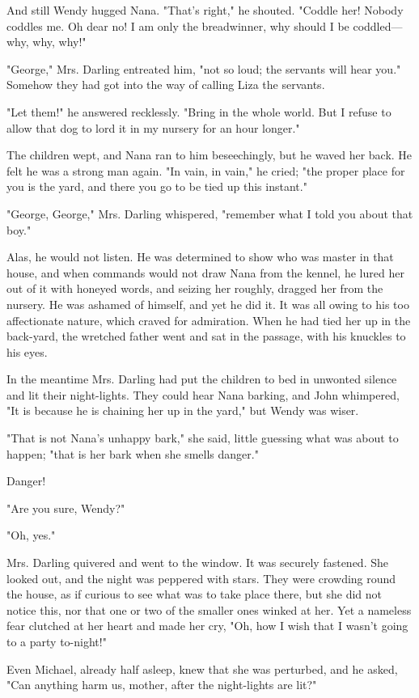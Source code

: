 And still Wendy hugged Nana. "That's right," he shouted. "Coddle her!
Nobody coddles me. Oh dear no! I am only the breadwinner, why should I be
coddled—why, why, why!"


"George," Mrs. Darling entreated him, "not so loud; the servants will hear
you." Somehow they had got into the way of calling Liza the servants.


"Let them!" he answered recklessly. "Bring in the whole world. But I
refuse to allow that dog to lord it in my nursery for an hour longer."


The children wept, and Nana ran to him beseechingly, but he waved her
back. He felt he was a strong man again. "In vain, in vain," he cried;
"the proper place for you is the yard, and there you go to be tied up this
instant."


"George, George," Mrs. Darling whispered, "remember what I told you about
that boy."


Alas, he would not listen. He was determined to show who was master in
that house, and when commands would not draw Nana from the kennel, he
lured her out of it with honeyed words, and seizing her roughly, dragged
her from the nursery. He was ashamed of himself, and yet he did it. It was
all owing to his too affectionate nature, which craved for admiration.
When he had tied her up in the back-yard, the wretched father went and sat
in the passage, with his knuckles to his eyes.


In the meantime Mrs. Darling had put the children to bed in unwonted
silence and lit their night-lights. They could hear Nana barking, and John
whimpered, "It is because he is chaining her up in the yard," but Wendy
was wiser.


"That is not Nana's unhappy bark," she said, little guessing what was
about to happen; "that is her bark when she smells danger."


Danger!


"Are you sure, Wendy?"


"Oh, yes."


Mrs. Darling quivered and went to the window. It was securely fastened.
She looked out, and the night was peppered with stars. They were crowding
round the house, as if curious to see what was to take place there, but
she did not notice this, nor that one or two of the smaller ones winked at
her. Yet a nameless fear clutched at her heart and made her cry, "Oh, how
I wish that I wasn't going to a party to-night!"


Even Michael, already half asleep, knew that she was perturbed, and he
asked, "Can anything harm us, mother, after the night-lights are lit?"


